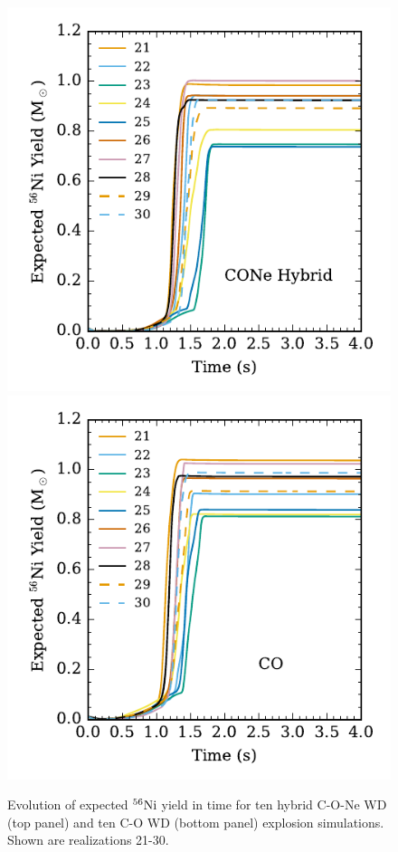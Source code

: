 \documentclass[preprint2]{aastex63}
\newcommand{\Ni}[1]{\ensuremath{{}^{#1}{\rm Ni}}}
\begin{document}
\begin{figure}
\includegraphics[width=\columnwidth]{figures/Hybrid_Ni56mass_v_time_plot.pdf}
\includegraphics[width=\columnwidth]{figures/CO_Ni56mass_v_time_plot.pdf}
\caption{\label{fig:nithybrid} \label{fig:nitco}
Evolution of expected \Ni{56} yield in time for ten hybrid C-O-Ne WD (top panel) and ten C-O WD (bottom panel) explosion simulations.
Shown are realizations 21-30.
}
\end{figure}
\end{document}
